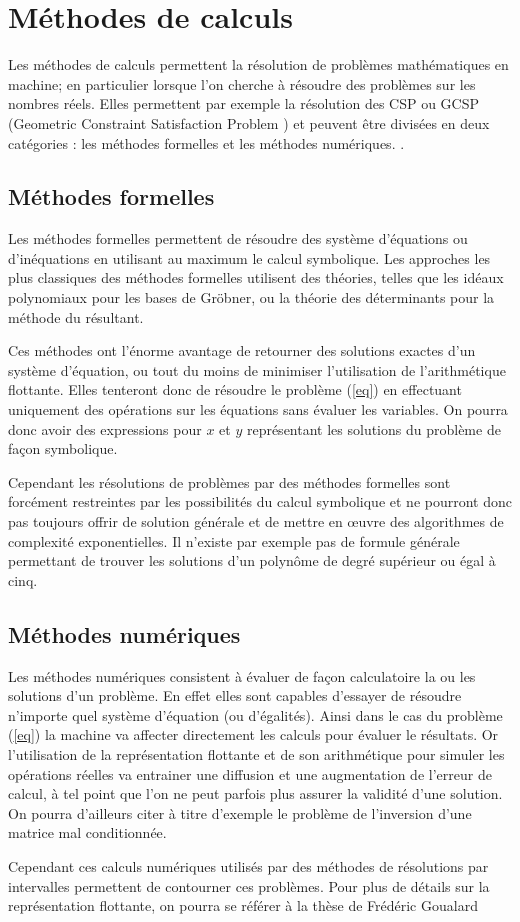 \section{Méthodes de calculs}
Les méthodes de calculs permettent la résolution de problèmes mathématiques en machine; en particulier lorsque l'on cherche à résoudre des problèmes sur les nombres réels. Elles permettent par exemple la résolution des CSP  ou GCSP (Geometric Constraint Satisfaction Problem \cite{Jermann}) et peuvent être divisées en deux catégories : les méthodes formelles et les méthodes numériques. . 


\subsection{Méthodes formelles}
Les méthodes formelles permettent de résoudre des système d'équations ou d'inéquations en utilisant au maximum le calcul symbolique. Les approches les plus classiques des méthodes formelles utilisent des théories, telles que les idéaux polynomiaux pour les bases de Gröbner, ou la théorie des déterminants pour la méthode du résultant.

 Ces méthodes ont l'énorme avantage de retourner des solutions exactes d'un système d'équation, ou tout du moins de minimiser l'utilisation de l'arithmétique flottante. Elles tenteront donc de résoudre le problème (\ref{eq}) en effectuant uniquement des opérations sur les équations sans évaluer les variables. On pourra donc avoir des expressions pour $x$ et $y$ représentant les solutions du problème de façon symbolique. 

Cependant les résolutions de problèmes par des méthodes formelles sont forcément restreintes par les possibilités du calcul symbolique et ne pourront donc pas toujours offrir de solution générale et de mettre en œuvre des algorithmes de complexité exponentielles. Il n'existe par exemple pas de formule générale permettant de trouver les solutions d'un polynôme de degré supérieur ou égal à cinq.


\subsection{Méthodes numériques}
Les méthodes numériques consistent à évaluer de façon calculatoire la ou les solutions d'un problème. En effet elles sont capables d'essayer de résoudre n'importe quel système d'équation (ou d'égalités). Ainsi dans le cas du problème (\ref{eq}) la machine va affecter directement les calculs pour évaluer le résultats. Or l'utilisation de la représentation flottante et de son arithmétique pour simuler les opérations réelles va entrainer une diffusion et une augmentation de l'erreur de calcul, à tel point que l'on ne peut  parfois plus assurer la validité d'une solution. On pourra d'ailleurs citer à titre d'exemple le problème de l'inversion d'une matrice mal conditionnée\cite{Conditionnement}. 

Cependant ces calculs numériques utilisés  par des méthodes de résolutions par intervalles permettent de contourner ces problèmes. Pour plus de détails sur la représentation flottante, on pourra se référer à la thèse de Frédéric Goualard \cite{Goualard}

